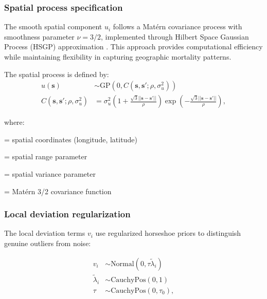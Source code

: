 \documentclass[11pt]{article}\usepackage[]{graphicx}\usepackage[]{xcolor}
\begin{document}
\subsubsection{Spatial process specification}

The smooth spatial component $u_i$ follows a Matérn covariance process with smoothness parameter $\nu = 3/2$, implemented through Hilbert Space Gaussian Process (HSGP) approximation \citep{solin2020hilbert, riutort2023practical}. This approach provides computational efficiency while maintaining flexibility in capturing geographic mortality patterns.

The spatial process is defined by:
\begin{align}
u(\mathbf{s}) &\sim \text{GP}(0, C(\mathbf{s}, \mathbf{s}'; \rho, \sigma_u^2)) \\
C(\mathbf{s}, \mathbf{s}'; \rho, \sigma_u^2) &= \sigma_u^2 \left(1 + \frac{\sqrt{3}||\mathbf{s} - \mathbf{s}'||}{\rho}\right) \exp\left(-\frac{\sqrt{3}||\mathbf{s} - \mathbf{s}'||}{\rho}\right),
\end{align}

\noindent where:
\begin{description}[leftmargin=2em]
\item[$\mathbf{s}$] = spatial coordinates (longitude, latitude)
\item[$\rho$] = spatial range parameter
\item[$\sigma_u^2$] = spatial variance parameter
\item[$C(\cdot, \cdot; \rho, \sigma_u^2)$] = Matérn 3/2 covariance function
\end{description}

\subsubsection{Local deviation regularization}

The local deviation terms $v_i$ use regularized horseshoe priors \citep{carvalho2010horseshoe, piironen2017hyper} to distinguish genuine outliers from noise:

\begin{align}
v_i &\sim \text{Normal}(0, \tau \tilde{\lambda}_i) \\
\tilde{\lambda}_i &\sim \text{CauchyPos}(0, 1) \\
\tau &\sim \text{CauchyPos}(0, \tau_0),
\end{align}
\end{document}

